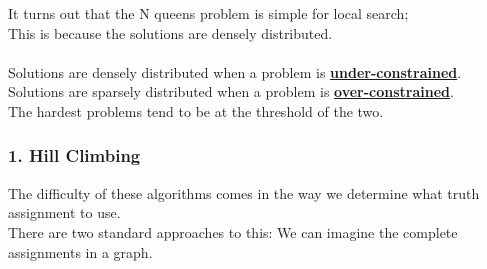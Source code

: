 \documentclass[../../lecture_notes.tex]{subfiles}
\begin{document}
\begin{center} \end{center} 

\noindent It turns out that the N queens problem is simple for local search;\\
\indent This is because the solutions are densely distributed.\\
\\
Solutions are densely distributed when a problem is \textbf{\underline{under-constrained}}.\\
Solutions are sparsely distributed when a problem is \textbf{\underline{over-constrained}}.\\
The hardest problems tend to be at the threshold of the two.

\subsubsection*{1. Hill Climbing}
\noindent The difficulty of these algorithms comes in the way we determine what truth assignment to use.\\
There are two standard approaches to this:
We can imagine the complete assignments in a graph.\\
\end{document}

